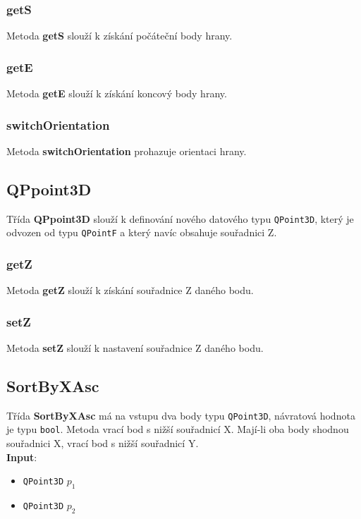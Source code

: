\documentclass[a4paper, 12pt]{article}
\begin{document}
\subsubsection*{getS}
Metoda \textbf{getS} slouží k získání počáteční body hrany. 

\subsubsection*{getE}
Metoda \textbf{getE} slouží k získání koncový body hrany. 

\subsubsection*{switchOrientation}
Metoda \textbf{switchOrientation} prohazuje orientaci hrany.  


\subsection{QPpoint3D}
Třída \textbf{QPpoint3D} slouží k definování nového datového typu \texttt{QPoint3D}, který je odvozen od typu \texttt{QPointF} a který navíc obsahuje souřadnici Z.

\subsubsection*{getZ}
Metoda \textbf{getZ} slouží k získání souřadnice Z daného bodu.

\subsubsection*{setZ}
Metoda \textbf{setZ} slouží k nastavení souřadnice Z daného bodu. 


\subsection{SortByXAsc}
Třída \textbf{SortByXAsc} má na vstupu dva body typu \texttt{QPoint3D}, návratová hodnota je typu \texttt{bool}. Metoda vrací bod s nižší  souřadnicí X. Mají-li oba body shodnou souřadnici X, vrací bod s nižší souřadnicí Y.\\

\textbf{Input}:
\begin{itemize}
\item \texttt{QPoint3D} $p_1$
\item \texttt{QPoint3D} $p_2$
\end{itemize}
\end{document}
